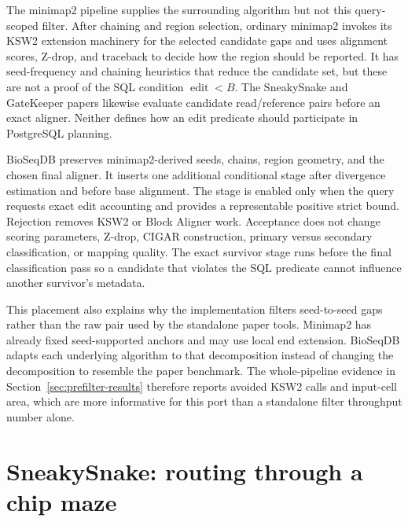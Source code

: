 The minimap2 pipeline supplies the surrounding algorithm but not this
query-scoped filter.  After chaining and region selection, ordinary minimap2
invokes its KSW2 extension machinery for the selected candidate gaps and uses
alignment scores, Z-drop, and traceback to decide how the region should be
reported.  It has seed-frequency and chaining heuristics that reduce the
candidate set, but these are not a proof of the SQL condition
\(\operatorname{edit}<B\).  The SneakySnake and GateKeeper papers likewise
evaluate candidate read/reference pairs before an exact aligner.  Neither
defines how an edit predicate should participate in PostgreSQL planning.

BioSeqDB preserves minimap2-derived seeds, chains, region geometry, and the
chosen final aligner.  It inserts one additional conditional stage after
divergence estimation and before base alignment.  The stage is enabled only
when the query requests exact edit accounting and provides a representable
positive strict bound.  Rejection removes KSW2 or Block Aligner work.
Acceptance does not change scoring parameters, Z-drop, CIGAR construction, primary versus
secondary classification, or mapping quality.  The exact survivor stage runs
before the final classification pass so a candidate that violates the SQL
predicate cannot influence another survivor's metadata.

This placement also explains why the implementation filters seed-to-seed gaps
rather than the raw pair used by the standalone paper tools.  Minimap2 has
already fixed seed-supported anchors and may use local end extension.  BioSeqDB
adapts each underlying algorithm to that decomposition instead of changing the
decomposition to resemble the paper benchmark.  The whole-pipeline evidence in
Section~\ref{sec:prefilter-results} therefore reports avoided KSW2 calls and
input-cell area, which are more informative for this port than a standalone
filter throughput number alone.

\section{SneakySnake: routing through a chip maze}
\label{sec:prefilter-sneakysnake}

